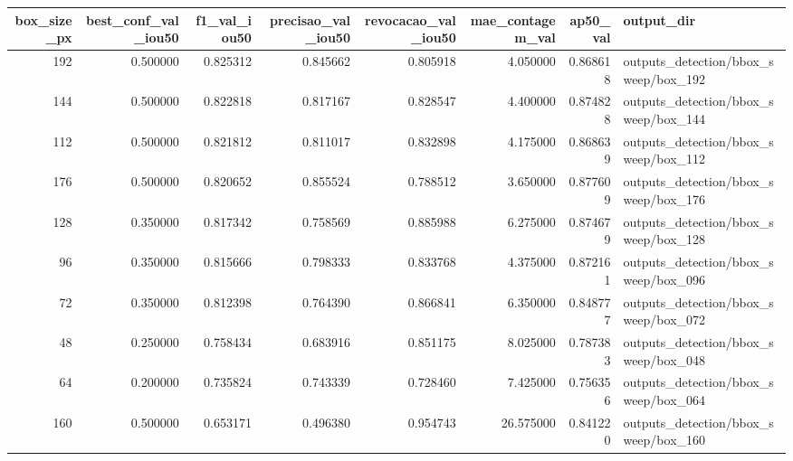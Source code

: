 \begin{tabular}{rrrrrrrl}
\toprule
box_size_px & best_conf_val_iou50 & f1_val_iou50 & precisao_val_iou50 & revocacao_val_iou50 & mae_contagem_val & ap50_val & output_dir \\
\midrule
192 & 0.500000 & 0.825312 & 0.845662 & 0.805918 & 4.050000 & 0.868618 & outputs_detection/bbox_sweep/box_192 \\
144 & 0.500000 & 0.822818 & 0.817167 & 0.828547 & 4.400000 & 0.874828 & outputs_detection/bbox_sweep/box_144 \\
112 & 0.500000 & 0.821812 & 0.811017 & 0.832898 & 4.175000 & 0.868639 & outputs_detection/bbox_sweep/box_112 \\
176 & 0.500000 & 0.820652 & 0.855524 & 0.788512 & 3.650000 & 0.877609 & outputs_detection/bbox_sweep/box_176 \\
128 & 0.350000 & 0.817342 & 0.758569 & 0.885988 & 6.275000 & 0.874679 & outputs_detection/bbox_sweep/box_128 \\
96 & 0.350000 & 0.815666 & 0.798333 & 0.833768 & 4.375000 & 0.872161 & outputs_detection/bbox_sweep/box_096 \\
72 & 0.350000 & 0.812398 & 0.764390 & 0.866841 & 6.350000 & 0.848777 & outputs_detection/bbox_sweep/box_072 \\
48 & 0.250000 & 0.758434 & 0.683916 & 0.851175 & 8.025000 & 0.787383 & outputs_detection/bbox_sweep/box_048 \\
64 & 0.200000 & 0.735824 & 0.743339 & 0.728460 & 7.425000 & 0.756356 & outputs_detection/bbox_sweep/box_064 \\
160 & 0.500000 & 0.653171 & 0.496380 & 0.954743 & 26.575000 & 0.841220 & outputs_detection/bbox_sweep/box_160 \\
\bottomrule
\end{tabular}
